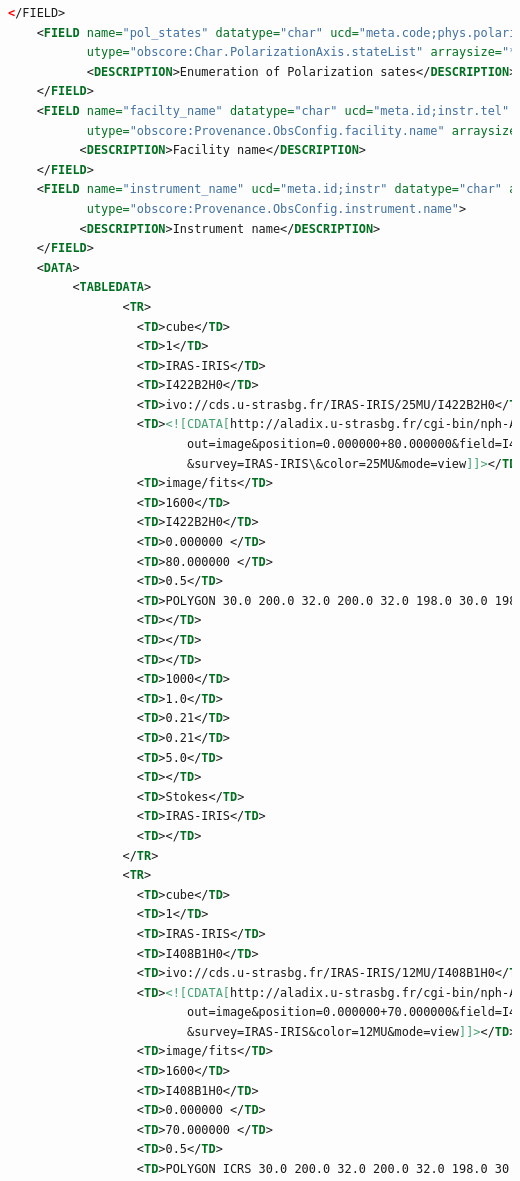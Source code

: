 \documentclass[11pt,a4paper]{ivoa}
\begin{document}
\begin{lstlisting}[basicstyle=\scriptsize,language=XML]
    </FIELD> 
    <FIELD name="pol_states" datatype="char" ucd="meta.code;phys.polarization"
           utype="obscore:Char.PolarizationAxis.stateList" arraysize="*" > 
           <DESCRIPTION>Enumeration of Polarization sates</DESCRIPTION>
    </FIELD> 
    <FIELD name="facilty_name" datatype="char" ucd="meta.id;instr.tel" 
           utype="obscore:Provenance.ObsConfig.facility.name" arraysize="*"> 
          <DESCRIPTION>Facility name</DESCRIPTION>
    </FIELD> 
    <FIELD name="instrument_name" ucd="meta.id;instr" datatype="char" arraysize="*"
           utype="obscore:Provenance.ObsConfig.instrument.name"> 
          <DESCRIPTION>Instrument name</DESCRIPTION>  
    </FIELD> 
    <DATA> 
         <TABLEDATA> 
                <TR> 
                  <TD>cube</TD> 
                  <TD>1</TD> 
                  <TD>IRAS-IRIS</TD> 
                  <TD>I422B2H0</TD> 
                  <TD>ivo://cds.u-strasbg.fr/IRAS-IRIS/25MU/I422B2H0</TD> 
                  <TD><![CDATA[http://aladix.u-strasbg.fr/cgi-bin/nph-Aladin++dev.cgi?
                         out=image&position=0.000000+80.000000&field=I422B2H0
                         &survey=IRAS-IRIS\&color=25MU&mode=view]]></TD> 
                  <TD>image/fits</TD> 
                  <TD>1600</TD> 
                  <TD>I422B2H0</TD> 
                  <TD>0.000000 </TD> 
                  <TD>80.000000 </TD> 
                  <TD>0.5</TD> 
                  <TD>POLYGON 30.0 200.0 32.0 200.0 32.0 198.0 30.0 198.0</TD> 
                  <TD></TD> 
                  <TD></TD> 
                  <TD></TD> 
                  <TD>1000</TD> 
                  <TD>1.0</TD> 
                  <TD>0.21</TD> 
                  <TD>0.21</TD> 
                  <TD>5.0</TD> 
                  <TD></TD> 
                  <TD>Stokes</TD> 
                  <TD>IRAS-IRIS</TD> 
                  <TD></TD> 
                </TR> 
                <TR> 
                  <TD>cube</TD> 
                  <TD>1</TD> 
                  <TD>IRAS-IRIS</TD> 
                  <TD>I408B1H0</TD> 
                  <TD>ivo://cds.u-strasbg.fr/IRAS-IRIS/12MU/I408B1H0</TD> 
                  <TD><![CDATA[http://aladix.u-strasbg.fr/cgi-bin/nph-Aladin++dev.cgi?
                         out=image&position=0.000000+70.000000&field=I408B1H0
                         &survey=IRAS-IRIS&color=12MU&mode=view]]></TD> 
                  <TD>image/fits</TD> 
                  <TD>1600</TD> 
                  <TD>I408B1H0</TD> 
                  <TD>0.000000 </TD> 
                  <TD>70.000000 </TD> 
                  <TD>0.5</TD> 
                  <TD>POLYGON ICRS 30.0 200.0 32.0 200.0 32.0 198.0 30.0 198.0</TD> 

\end{lstlisting}
\end{document}
